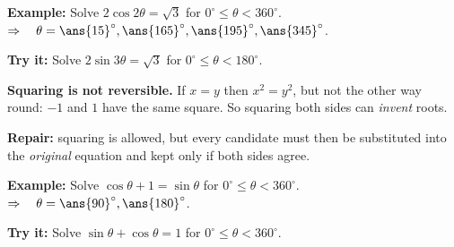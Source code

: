 \documentclass[12pt]{article}
\begin{document}
\begin{examplebox}
\textbf{Example:} \quad Solve $2\cos 2\theta = \sqrt{3}$ for $0^\circ \le \theta < 360^\circ$.
\step{$u = 2\theta$ on $[0^\circ, 720^\circ)$: $\cos u = \dfrac{\sqrt{3}}{2}$ at $u = 30^\circ, 330^\circ, 390^\circ, 690^\circ$; halve each.}
$\Rightarrow\quad \theta = \ans{15}^\circ, \ans{165}^\circ, \ans{195}^\circ, \ans{345}^\circ$.
\end{examplebox}

\begin{tryitbox}
\textbf{Try it:} \quad Solve $2\sin 3\theta = \sqrt{3}$ for $0^\circ \le \theta < 180^\circ$.\\[2pt]
\end{tryitbox}


\begin{formulabox}
\textbf{Squaring is not reversible.} If $x = y$ then $x^2 = y^2$, but not the other way round: $-1$ and $1$ have the same square. So squaring both sides can \emph{invent} roots.\par
\textbf{Repair:} squaring is allowed, but every candidate must then be substituted into the \emph{original} equation and kept only if both sides agree.
\end{formulabox}

\begin{examplebox}
\textbf{Example:} \quad Solve $\cos\theta + 1 = \sin\theta$ for $0^\circ \le \theta < 360^\circ$.
$\Rightarrow\quad \theta = \ans{90}^\circ, \ans{180}^\circ$.
\end{examplebox}

\begin{tryitbox}
\textbf{Try it:} \quad Solve $\sin\theta + \cos\theta = 1$ for $0^\circ \le \theta < 360^\circ$.\\[2pt]
\end{tryitbox}
\end{document}
